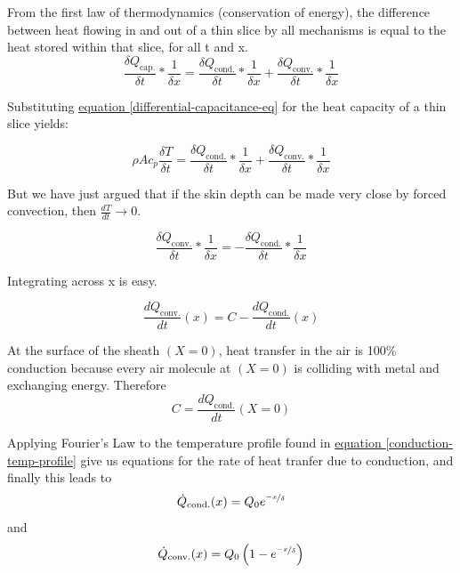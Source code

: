 \documentclass[10pt, twocolumn]{article}
\begin{document}
From the first law of thermodynamics (conservation of energy),
the difference between heat flowing in and out of a thin slice by
all mechanisms is equal to the heat stored within that slice, for all t and x.
\begin{equation*}
\frac{\delta Q_{\textrm{cap.}}}{\delta t}*\frac{1}{\delta x}=
\frac{\delta Q_{\textrm{cond.}}}{\delta t}*\frac{1}{\delta x}+
\frac{\delta Q_{\textrm{conv.}}}{\delta t}*\frac{1}{\delta x}
\end{equation*}

Substituting
\hyperref[differential-capacitance-eq]{equation \ref{differential-capacitance-eq}}
for the heat capacity of a thin slice yields:

\begin{equation*}
\rho A c_{p}\frac{\delta T}{\delta t}=
\frac{\delta Q_{\textrm{cond.}}}{\delta t}*\frac{1}{\delta x}+
\frac{\delta Q_{\textrm{conv.}}}{\delta t}*\frac{1}{\delta x}
\end{equation*}

But we have just argued that if the skin depth can be made very close
by forced convection, then $\frac{dT}{dt}\rightarrow 0$.

\begin{equation*}
\frac{\delta Q_{\textrm{conv.}}}{\delta t}*\frac{1}{\delta x}=-
\frac{\delta Q_{\textrm{cond.}}}{\delta t}*\frac{1}{\delta x}
\end{equation*}

Integrating across x is easy.

\begin{equation*}
\frac{dQ_{\textrm{conv.}}}{dt}(x)=C-
\frac{dQ_{\textrm{cond.}}}{dt}(x)
\end{equation*}

At the surface of the sheath \((X=0)\), heat transfer in the air is
100\% conduction because every air molecule at \((X=0)\) is colliding
with metal and exchanging energy. Therefore
\begin{equation*}
C=\frac{dQ_{\textrm{cond.}}}{dt}(X=0)
\end{equation*}

Applying Fourier's Law to the temperature profile found in
\hyperref[conduction-temp-profile]{equation \ref{conduction-temp-profile}}
give us equations for the rate of heat tranfer due to conduction,
and finally this leads to
\begin{equation*}
\dot{Q}_{\textrm{cond.}}(x)=Q_{0}e^{\nicefrac{-x}{\delta}}
\end{equation*}
and
\begin{equation*}
\dot{Q}_{\textrm{conv.}}(x)=Q_{0}\left(1-e^{\nicefrac{-x}{\delta}}\right)
\end{equation*}
\end{document}
